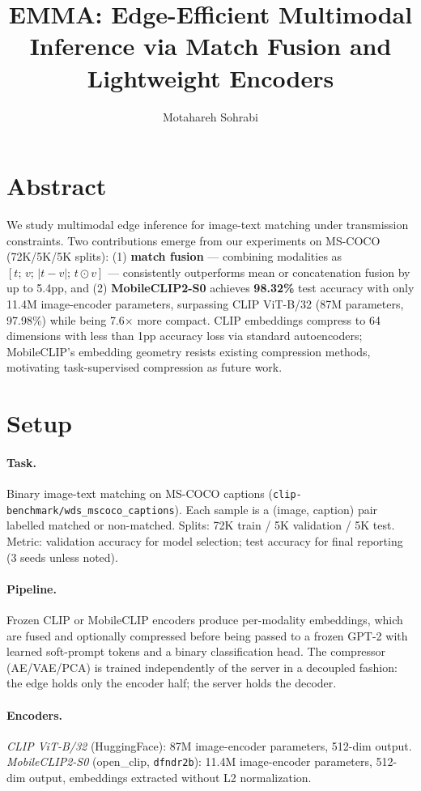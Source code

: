 \documentclass[10pt,twocolumn]{article}
\title{\textbf{EMMA: Edge-Efficient Multimodal Inference via Match Fusion and Lightweight Encoders}}
\author{Motahareh Sohrabi}
\date{}
\begin{document}
\maketitle

\section*{Abstract}
We study multimodal edge inference for image-text matching under transmission constraints.
Two contributions emerge from our experiments on MS-COCO (72K/5K/5K splits):
(1) \textbf{match fusion} --- combining modalities as $[t;\,v;\,|t{-}v|;\,t{\odot}v]$ --- consistently
outperforms mean or concatenation fusion by up to 5.4pp, and
(2) \textbf{MobileCLIP2-S0} achieves \textbf{98.32\%} test accuracy with only 11.4M image-encoder
parameters, surpassing CLIP ViT-B/32 (87M parameters, 97.98\%) while being 7.6$\times$
more compact.
CLIP embeddings compress to 64 dimensions with less than 1pp accuracy loss via standard
autoencoders; MobileCLIP's embedding geometry resists existing compression methods,
motivating task-supervised compression as future work.

\section{Setup}

\paragraph{Task.} Binary image-text matching on MS-COCO captions
(\texttt{clip-benchmark/wds\_mscoco\_captions}).
Each sample is a (image, caption) pair labelled matched or non-matched.
Splits: 72K train / 5K validation / 5K test.
Metric: validation accuracy for model selection; test accuracy for final reporting (3 seeds unless noted).

\paragraph{Pipeline.} Frozen CLIP or MobileCLIP encoders produce per-modality embeddings,
which are fused and optionally compressed before being passed to a frozen GPT-2 with
learned soft-prompt tokens and a binary classification head.
The compressor (AE/VAE/PCA) is trained independently of the server in a decoupled fashion:
the edge holds only the encoder half; the server holds the decoder.

\paragraph{Encoders.}
\textit{CLIP ViT-B/32} (HuggingFace): 87M image-encoder parameters, 512-dim output.
\textit{MobileCLIP2-S0} (open\_clip, \texttt{dfndr2b}): 11.4M image-encoder parameters,
512-dim output, embeddings extracted without L2 normalization.
\end{document}
